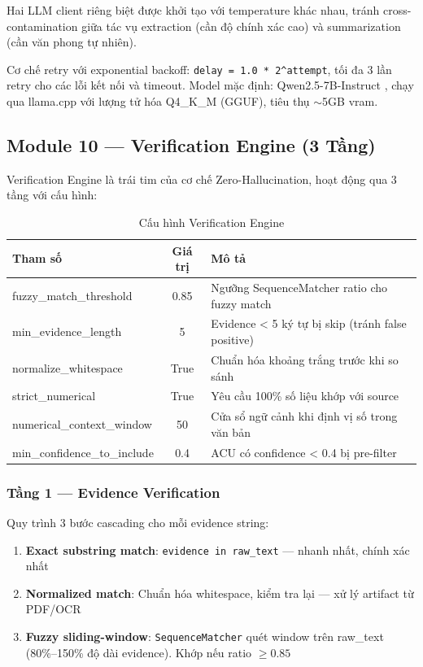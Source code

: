 Hai LLM client riêng biệt được khởi tạo với temperature khác nhau, tránh cross-contamination giữa tác vụ extraction (cần độ chính xác cao) và summarization (cần văn phong tự nhiên).

Cơ chế retry với exponential backoff: \texttt{delay = 1.0 * 2\textasciicircum attempt}, tối đa 3 lần retry cho các lỗi kết nối và timeout. Model mặc định: Qwen2.5-7B-Instruct \cite{qwen2025}, chạy qua llama.cpp với lượng tử hóa Q4\_K\_M (GGUF), tiêu thụ $\sim$5GB \gls{vram}.

\subsection{Module 10 — Verification Engine (3 Tầng)}

Verification Engine là trái tim của cơ chế Zero-Hallucination, hoạt động qua 3 tầng với cấu hình:

\begin{table}[H]
    \centering
    \caption{Cấu hình Verification Engine}
    \label{tab:verification_config}
    \begin{tabularx}{\textwidth}{X c X}
        \toprule
        \textbf{Tham số} & \textbf{Giá trị} & \textbf{Mô tả}\\
        \midrule
        fuzzy\_match\_threshold & 0.85 & Ngưỡng SequenceMatcher ratio cho fuzzy match\\
        min\_evidence\_length & 5 & Evidence < 5 ký tự bị skip (tránh false positive)\\
        normalize\_whitespace & True & Chuẩn hóa khoảng trắng trước khi so sánh\\
        strict\_numerical & True & Yêu cầu 100\% số liệu khớp với source\\
        numerical\_context\_window & 50 & Cửa sổ ngữ cảnh khi định vị số trong văn bản\\
        min\_confidence\_to\_include & 0.4 & ACU có confidence < 0.4 bị pre-filter\\
        \bottomrule
    \end{tabularx}
\end{table}

\subsubsection{Tầng 1 — Evidence Verification}

Quy trình 3 bước cascading cho mỗi evidence string:

\begin{enumerate}[label=(\arabic*)]
    \item \textbf{Exact substring match}: \texttt{evidence in raw\_text} — nhanh nhất, chính xác nhất
    \item \textbf{Normalized match}: Chuẩn hóa whitespace, kiểm tra lại — xử lý artifact từ PDF/OCR
    \item \textbf{Fuzzy sliding-window}: \texttt{SequenceMatcher} quét window trên raw\_text (80\%–150\% độ dài evidence). Khớp nếu ratio $\geq 0.85$
\end{enumerate}

